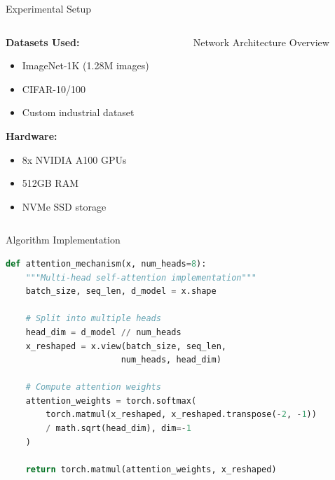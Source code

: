 \documentclass[10pt,aspectratio=169]{beamer}
\begin{document}
\begin{frame}{Experimental Setup}
\begin{columns}
\begin{column}{0.5\textwidth}
\textbf{Datasets Used:}
\begin{itemize}
\item ImageNet-1K (1.28M images)
\item CIFAR-10/100
\item Custom industrial dataset
\end{itemize}

\textbf{Hardware:}
\begin{itemize}
\item 8x NVIDIA A100 GPUs
\item 512GB RAM
\item NVMe SSD storage
\end{itemize}
\end{column}
\begin{column}{0.5\textwidth}
\begin{figure}
\centering
{}
\caption{Network Architecture Overview}
\end{figure}
\end{column}
\end{columns}
\end{frame}

\begin{frame}[fragile]{Algorithm Implementation}
\begin{lstlisting}[language=Python]
def attention_mechanism(x, num_heads=8):
    """Multi-head self-attention implementation"""
    batch_size, seq_len, d_model = x.shape
    
    # Split into multiple heads
    head_dim = d_model // num_heads
    x_reshaped = x.view(batch_size, seq_len, 
                       num_heads, head_dim)
    
    # Compute attention weights
    attention_weights = torch.softmax(
        torch.matmul(x_reshaped, x_reshaped.transpose(-2, -1)) 
        / math.sqrt(head_dim), dim=-1
    )
    
    return torch.matmul(attention_weights, x_reshaped)
\end{lstlisting}
\end{frame}
\end{document}

